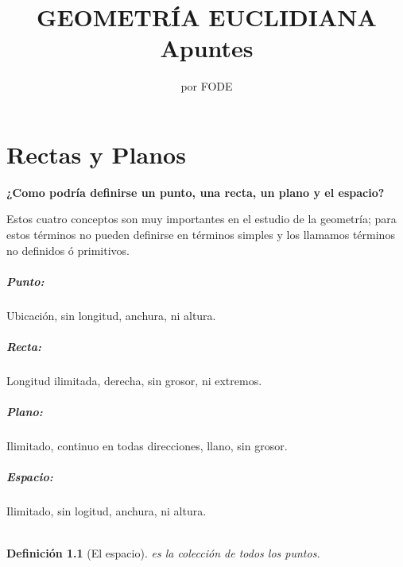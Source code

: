 \documentclass[10pt]{book}
\newtheorem{def.}{\textbf{Definición}}[chapter]%
\begin{document}
\normalfont

\author{\Large por FODE}
\title{GEOMETRÍA EUCLIDIANA \\ \small Apuntes}
\date{}
\pagestyle{empty}
\maketitle
\thispagestyle{empty}
\let\cleardoublepage\clearpage
\tableofcontents 								%


 
\let\cleardoublepage\clearpage

\chapter{Rectas y Planos}
\begin{center}
\textbf{¿Como podría definirse un punto, una recta, un plano y el espacio?}\\
\end{center}
Estos cuatro conceptos son muy importantes en el estudio de la geometría; para estos términos no pueden definirse en términos simples y los llamamos términos no definidos ó primitivos.
\paragraph{Punto:} Ubicación, sin longitud, anchura, ni altura.
\paragraph{Recta:} Longitud ilimitada, derecha, sin grosor, ni extremos.
\paragraph{Plano:} Ilimitado, continuo en todas direcciones, llano, sin grosor.
\paragraph{Espacio:} Ilimitado, sin logitud, anchura, ni altura.\\\\
\begin{tcolorbox}
\begin{def.}[El espacio]
es la colección de todos los puntos.
\end{def.}
\end{tcolorbox}
\end{document}
